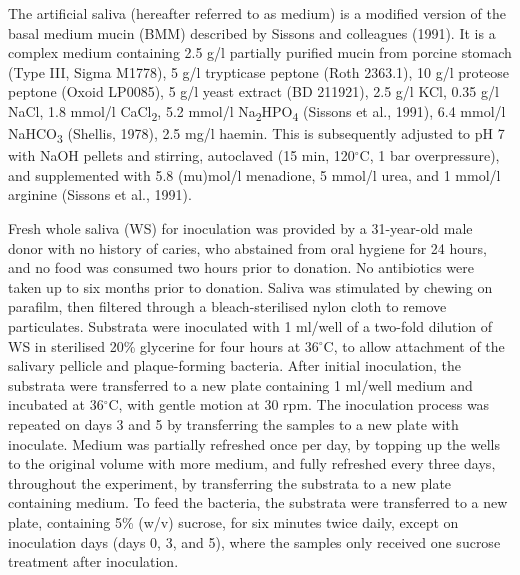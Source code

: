 \documentclass[
]{article}
\begin{document}
The artificial saliva (hereafter referred to as medium) is a modified
version of the basal medium mucin (BMM) described by Sissons and
colleagues (1991). It is a complex medium containing 2.5 g/l partially
purified mucin from porcine stomach (Type III, Sigma M1778), 5 g/l
trypticase peptone (Roth 2363.1), 10 g/l proteose peptone (Oxoid
LP0085), 5 g/l yeast extract (BD 211921), 2.5 g/l KCl, 0.35 g/l NaCl,
1.8 mmol/l CaCl\textsubscript{2}, 5.2 mmol/l
Na\textsubscript{2}HPO\textsubscript{4} (Sissons et al., 1991), 6.4
mmol/l NaHCO\textsubscript{3} (Shellis, 1978), 2.5 mg/l haemin. This is
subsequently adjusted to pH 7 with NaOH pellets and stirring, autoclaved
(15 min, 120\(^{\circ}\)C, 1 bar overpressure), and supplemented with
5.8 (mu)mol/l menadione, 5 mmol/l urea, and 1 mmol/l arginine (Sissons
et al., 1991).

Fresh whole saliva (WS) for inoculation was provided by a 31-year-old
male donor with no history of caries, who abstained from oral hygiene
for 24 hours, and no food was consumed two hours prior to donation. No
antibiotics were taken up to six months prior to donation. Saliva was
stimulated by chewing on parafilm, then filtered through a
bleach-sterilised nylon cloth to remove particulates. Substrata were
inoculated with 1 ml/well of a two-fold dilution of WS in sterilised
20\% glycerine for four hours at 36\(^{\circ}\)C, to allow attachment of
the salivary pellicle and plaque-forming bacteria. After initial
inoculation, the substrata were transferred to a new plate containing 1
ml/well medium and incubated at 36\(^{\circ}\)C, with gentle motion at
30 rpm. The inoculation process was repeated on days 3 and 5 by
transferring the samples to a new plate with inoculate. Medium was
partially refreshed once per day, by topping up the wells to the
original volume with more medium, and fully refreshed every three days,
throughout the experiment, by transferring the substrata to a new plate
containing medium. To feed the bacteria, the substrata were transferred
to a new plate, containing 5\% (w/v) sucrose, for six minutes twice
daily, except on inoculation days (days 0, 3, and 5), where the samples
only received one sucrose treatment after inoculation.
\end{document}
